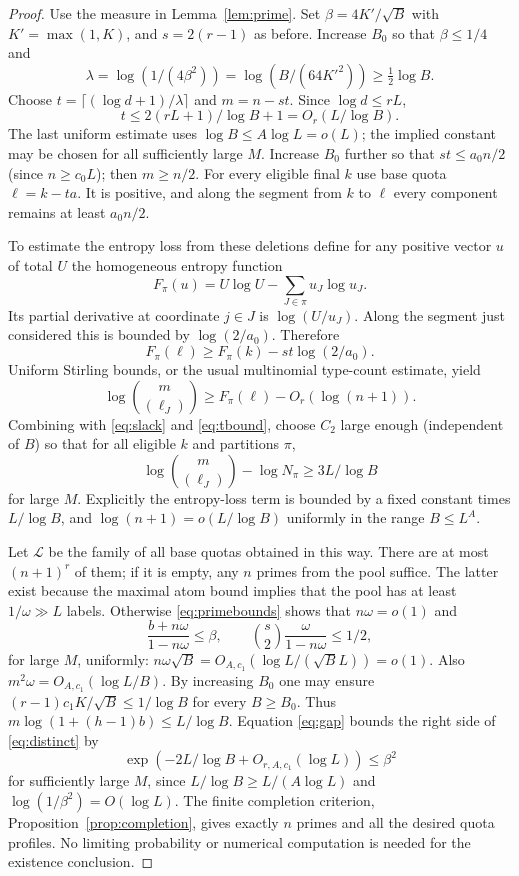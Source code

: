 \documentclass[11pt]{article}
\theoremstyle{definition}\newtheorem{remark}[theorem]{Remark}
\begin{document}
\begin{proof}
Use the measure in Lemma~\ref{lem:prime}. Set $\beta=4K'/\sqrt B$ with $K'=\max(1,K)$, and $s=2(r-1)$ as before. Increase $B_0$ so that $\beta\le1/4$ and
\[
 \lambda=\log(1/(4\beta^2))=\log(B/(64K'^2))\ge\tfrac12\log B.
\]
Choose $t=\lceil(\log d+1)/\lambda\rceil$ and $m=n-st$. Since $\log d\le rL$,
\begin{equation}\label{eq:tbound}
 t\le 2(rL+1)/\log B+1=O_r(L/\log B).
\end{equation}
The last uniform estimate uses $\log B\le A\log L=o(L)$; the implied constant may be chosen for all sufficiently large $M$. Increase $B_0$ further so that $st\le a_0 n/2$ (since $n\ge c_0 L$); then $m\ge n/2$. For every eligible final $k$ use base quota $\ell=k-ta$. It is positive, and along the segment from $k$ to $\ell$ every component remains at least $a_0n/2$.

To estimate the entropy loss from these deletions define for any positive vector $u$ of total $U$ the homogeneous entropy function
\[
 F_\pi(u)=U\log U-\sum_{J\in\pi}u_J\log u_J.
\]
Its partial derivative at coordinate $j\in J$ is $\log(U/u_J)$. Along the segment just considered this is bounded by $\log(2/a_0)$. Therefore
\begin{equation}\label{eq:loss}
 F_\pi(\ell)\ge F_\pi(k)-st\log(2/a_0).
\end{equation}
Uniform Stirling bounds, or the usual multinomial type-count estimate, yield
\[
 \log\binom m{(\ell_J)}\ge F_\pi(\ell)-O_r(\log(n+1)).
\]
Combining with \eqref{eq:slack} and \eqref{eq:tbound}, choose $C_2$ large enough (independent of $B$) so that for all eligible $k$ and partitions $\pi$,
\begin{equation}\label{eq:gap}
 \log\binom m{(\ell_J)}-\log N_\pi\ge 3L/\log B
\end{equation}
for large $M$. Explicitly the entropy-loss term is bounded by a fixed constant times $L/\log B$, and $\log(n+1)=o(L/\log B)$ uniformly in the range $B\le L^A$.

Let $\mathcal L$ be the family of all base quotas obtained in this way. There are at most $(n+1)^r$ of them; if it is empty, any $n$ primes from the pool suffice. The latter exist because the maximal atom bound implies that the pool has at least $1/\omega\gg L$ labels. Otherwise \eqref{eq:primebounds} shows that $n\omega=o(1)$ and
\[
 \frac{b+n\omega}{1-n\omega}\le\beta,
 \qquad \binom{s}{2}\frac{\omega}{1-n\omega}\le1/2,
\]
for large $M$, uniformly: $n\omega\sqrt B=O_{A,c_1}(\log L/(\sqrt B L))=o(1)$. Also $m^2\omega=O_{A,c_1}(\log L/B)$. By increasing $B_0$ one may ensure $(r-1)c_1 K/\sqrt B\le1/\log B$ for every $B\ge B_0$. Thus $m\log(1+(h-1)b)\le L/\log B$. Equation \eqref{eq:gap} bounds the right side of \eqref{eq:distinct} by
\[
 \exp\left(-2L/\log B+O_{r,A,c_1}(\log L)\right)\le\beta^2
\]
for sufficiently large $M$, since $L/\log B\ge L/(A\log L)$ and $\log(1/\beta^2)=O(\log L)$. The finite completion criterion, Proposition~\ref{prop:completion}, gives exactly $n$ primes and all the desired quota profiles. No limiting probability or numerical computation is needed for the existence conclusion.
\end{proof}
\end{document}
